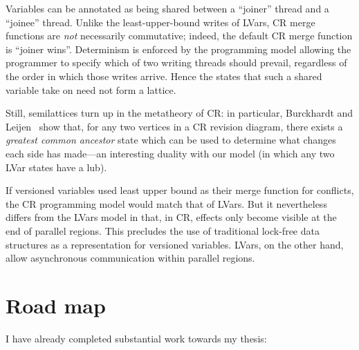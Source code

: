 \documentclass{article}
\begin{document}
Variables can be annotated as being shared between a ``joiner'' thread
and a ``joinee'' thread.  Unlike the least-upper-bound writes of
LVars, CR merge functions are \emph{not} necessarily commutative;
indeed, the default CR merge function is ``joiner wins''.  Determinism
is enforced by the programming model allowing the programmer to
specify which of two writing threads should prevail, regardless of the
order in which those writes arrive.  Hence the states that such a
shared variable take on need not form a lattice.

Still, semilattices turn up in the metatheory of CR: in particular,
Burckhardt and Leijen~\cite{semantics-concurrent-revisions} show that,
for any two vertices in a CR revision diagram, there exists a
\emph{greatest common ancestor} state which can be used to determine
what changes each side has made---an interesting duality with our
model (in which any two LVar states have a lub). 

If versioned variables used least upper bound as their merge function
for conflicts, the CR programming model would match that of LVars.    But it nevertheless
differs from the LVars model in that, in CR, effects only become
visible at the end of parallel regions. 
This precludes the use of traditional lock-free data structures as a
representation for versioned variables.  LVars, on the other hand,
allow asynchronous communication within parallel regions.

\section{Road map}

I have already completed substantial work towards my thesis:
\end{document}
